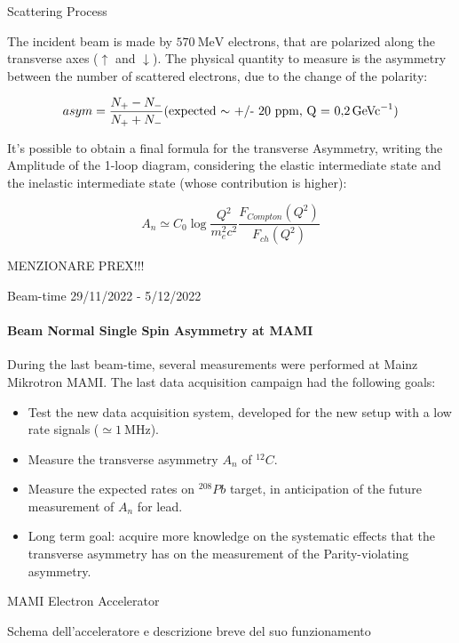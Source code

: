 \documentclass[9pt,a4paper]{beamer}
\begin{document}
\begin{frame}{Scattering Process}

The incident beam is made by $\SI{570}{\mega \electronvolt}$ electrons, that are polarized along the transverse axes ($\uparrow$ and $\downarrow$). The physical quantity to measure is the asymmetry between the number of scattered electrons, due to the change of the polarity:

\begin{equation}
asym = \frac{N_{+} - N_{-}}{N_{+} + N_{-}} \text{(expected $\sim$ +/- 20 ppm, Q = \SI{0.2}{\giga\electronvolt c^{-1}})}
\end{equation}

It's possible to obtain a final formula for the transverse Asymmetry, writing the Amplitude of the 1-loop diagram, considering the elastic intermediate state and the inelastic intermediate state (whose contribution is higher):

\begin{equation}
A_{n} \simeq C_{0} \log \frac{Q^{2}}{m^2_e c^2} \frac{F_{Compton} (Q^2)}{F_{ch}(Q^2)}
\end{equation}

MENZIONARE PREX!!!

\end{frame}


\begin{frame}{Beam-time 29/11/2022 - 5/12/2022}
\framesubtitle{Beam Normal Single Spin Asymmetry at MAMI}
During the last beam-time, several measurements were performed at Mainz Mikrotron MAMI. The last data acquisition campaign had the following goals:

\begin{itemize}
\item Test the new data acquisition system, developed for the new setup with a low rate signals ($\simeq \SI{1}{\mega \hertz} $). 
\item Measure the transverse asymmetry $A_{n}$ of $^{12}C$.
\item Measure the expected rates on $^{208}Pb$ target, in anticipation of the future measurement of $A_{n}$ for lead. 
\item Long term goal: acquire more knowledge on the systematic effects that the transverse asymmetry has on the measurement of the Parity-violating asymmetry.
\end{itemize}
\end{frame}

\begin{frame}{MAMI Electron Accelerator}

Schema dell'acceleratore e descrizione breve del suo funzionamento

\end{frame}
\end{document}
